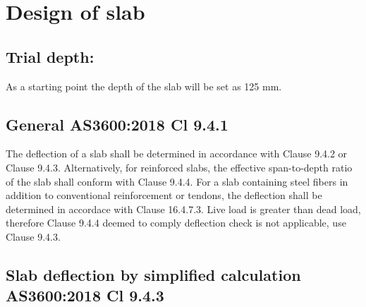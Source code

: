 \documentclass{article}%
\begin{document}
%
\normalsize%
\section*{Design of slab}%
\label{sec:Designofslab}%
\subsection*{Trial depth:}%
\label{subsec:Trialdepth}%

%
As a starting point the depth of the slab will be set as 125 mm.%
\subsection*{General AS3600:2018 Cl 9.4.1}%
\label{subsec:GeneralAS36002018Cl9.4.1}%

%
The deflection of a slab shall be determined in accordance with Clause 9.4.2 or Clause 9.4.3.\newline%
\newline%
Alternatively, for reinforced slabs, the effective span{-}to{-}depth ratio of the slab shall conform with Clause 9.4.4.\newline%
\newline%
For a slab containing steel fibers in addition to conventional reinforcement or tendons, the deflection shall be determined in accordace with Clause 16.4.7.3.\newline%
%
\newline%
 Live load is greater than dead load, therefore Clause 9.4.4 deemed to comply deflection check is not applicable, use Clause 9.4.3.%
\subsection*{Slab deflection by simplified calculation  AS3600:2018 Cl 9.4.3}%
\label{subsec:SlabdeflectionbysimplifiedcalculationAS36002018Cl9.4.3}%
\end{document}
